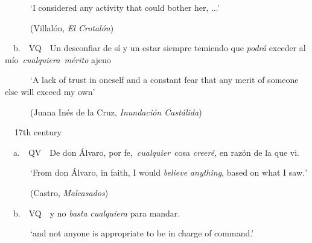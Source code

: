 \begin{styleStandard}
\ \ \ \ \ \ ‘I considered any activity that could bother her, ...’
\end{styleStandard}

\begin{styleStandard}
\ \ \ \ \ \ (Villalón, \textit{El Crotalón})
\end{styleStandard}

\begin{styleStandard}
\ \ b.\ \ VQ\ \ Un desconfiar de sí y un estar siempre temiendo que \textit{podrá }exceder al mío~\textit{cualquiera~mérito} ajeno 
\end{styleStandard}

\begin{styleStandard}
\ \ \ \ \ \ ‘A lack of trust in oneself and a constant fear that any merit of someone else will exceed my own’
\end{styleStandard}

\begin{styleStandard}
\ \ \ \ \ \ (Juana Inés de la Cruz,\textit{ Inundación Castálida})
\end{styleStandard}

\begin{styleStandard}
\textbf{\ \ }17th century
\end{styleStandard}

\begin{styleStandard}
\ \ a.\ \ QV\ \ De don Álvaro, por fe,~\textit{cualquier~}cosa\textit{ creeré}, en razón de la que vi. 
\end{styleStandard}

\begin{styleStandard}
\ \ \ \ \ \ ‘From don Álvaro, in faith, I would \textit{believe} \textit{anything}, based on what I saw\textit{.}’
\end{styleStandard}

\begin{styleStandard}
\ \ \ \ \ \ (Castro, \textit{Malcasados})
\end{styleStandard}

\begin{styleStandard}
\ \ b.\ \ VQ\ \ y no \textit{basta} \textit{cualquiera} para mandar. 
\end{styleStandard}

\begin{styleStandard}
\ \ \ \ \ \ ‘and not anyone is appropriate to be in charge of command.’
\end{styleStandard}

